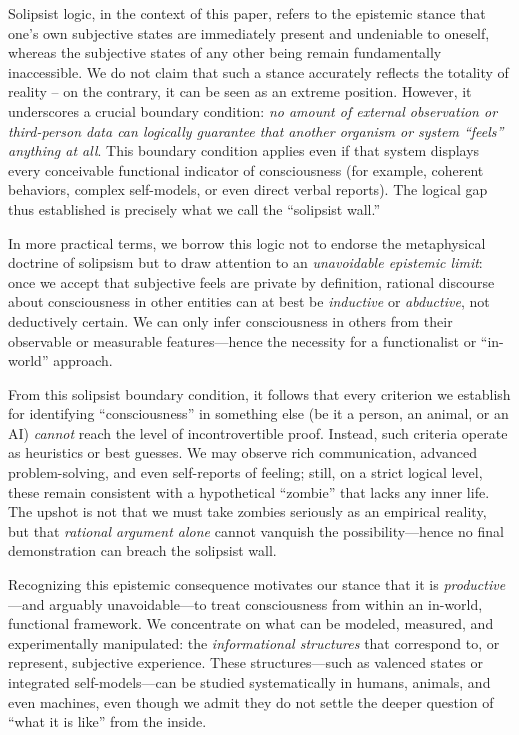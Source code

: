 \documentclass[12pt]{article}
\begin{document}

Solipsist logic, in the context of this paper, refers to the epistemic stance that one's own subjective states are immediately present and undeniable to oneself, whereas the subjective states of any other being remain fundamentally inaccessible. We do not claim that such a stance accurately reflects the totality of reality -- on the contrary, it can be seen as an extreme position. However, it underscores a crucial boundary condition: \textit{no amount of external observation or third-person data can logically guarantee that another organism or system ``feels'' anything at all}. This boundary condition applies even if that system displays every conceivable functional indicator of consciousness (for example, coherent behaviors, complex self-models, or even direct verbal reports). The logical gap thus established is precisely what we call the ``solipsist wall.''

In more practical terms, we borrow this logic not to endorse the metaphysical doctrine of solipsism but to draw attention to an \textit{unavoidable epistemic limit}: once we accept that subjective feels are private by definition, rational discourse about consciousness in other entities can at best be \textit{inductive} or \textit{abductive}, not deductively certain. We can only infer consciousness in others from their observable or measurable features---hence the necessity for a functionalist or ``in-world'' approach.


From this solipsist boundary condition, it follows that every criterion we establish for identifying ``consciousness'' in something else (be it a person, an animal, or an AI) \textit{cannot} reach the level of incontrovertible proof. Instead, such criteria operate as heuristics or best guesses. We may observe rich communication, advanced problem-solving, and even self-reports of feeling; still, on a strict logical level, these remain consistent with a hypothetical ``zombie'' that lacks any inner life. The upshot is not that we must take zombies seriously as an empirical reality, but that \textit{rational argument alone} cannot vanquish the possibility---hence no final demonstration can breach the solipsist wall.

Recognizing this epistemic consequence motivates our stance that it is \textit{productive}---and arguably unavoidable---to treat consciousness from within an in-world, functional framework. We concentrate on what can be modeled, measured, and experimentally manipulated: the \textit{informational structures} that correspond to, or represent, subjective experience. These structures---such as valenced states or integrated self-models---can be studied systematically in humans, animals, and even machines, even though we admit they do not settle the deeper question of ``what it is like'' from the inside.
\end{document}
